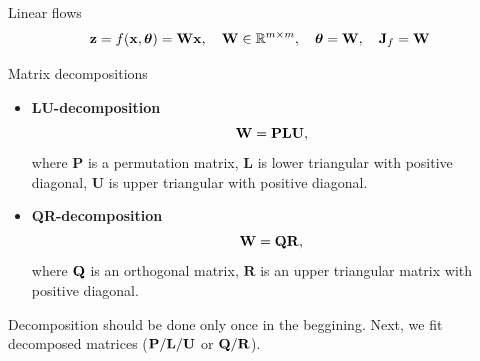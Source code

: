 \begin{frame}{Linear flows}
	\vspace{-0.5cm}
	\[
		\mathbf{z} = f(\mathbf{x}, \boldsymbol{\theta}) = \mathbf{W} \mathbf{x}, \quad \mathbf{W} \in \mathbb{R}^{m \times m}, \quad \boldsymbol{\theta} = \mathbf{W}, \quad \mathbf{J}_f = \mathbf{W}
	\]
	\vspace{-0.7cm}
	\begin{block}{Matrix decompositions}
		\begin{itemize}
			\item \textbf{LU-decomposition}
			\[
				\mathbf{W} = \mathbf{P} \mathbf{L} \mathbf{U},
			\]
			where $\mathbf{P}$ is a permutation matrix, $\mathbf{L}$ is lower triangular with positive diagonal, $\mathbf{U}$ is upper triangular with positive diagonal.
			\item \textbf{QR-decomposition}
			\[
				\mathbf{W} = \mathbf{Q} \mathbf{R},
			\]
			where $\mathbf{Q}$ is an orthogonal matrix, $\mathbf{R}$ is an upper triangular matrix with positive diagonal.
		\end{itemize}
	\end{block}

	Decomposition should be done only once in the beggining. Next, we fit decomposed matrices ($\mathbf{P}/\mathbf{L}/\mathbf{U}$ or $\mathbf{Q}/\mathbf{R}$).

\end{frame}
